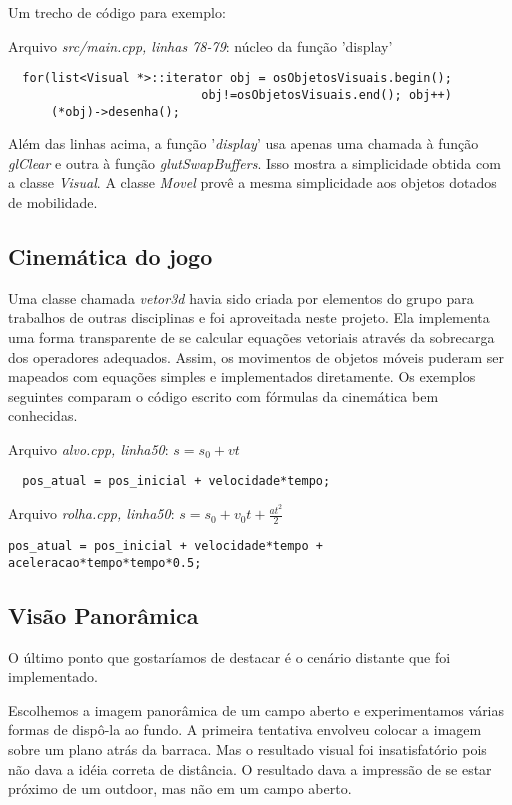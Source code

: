 \documentclass[a4paper,10pt]{article}
\begin{document}
Um trecho de código para exemplo:

Arquivo \emph{src/main.cpp, linhas 78-79}: núcleo da função 'display'
\begin{verbatim}
  for(list<Visual *>::iterator obj = osObjetosVisuais.begin();
                           obj!=osObjetosVisuais.end(); obj++)
      (*obj)->desenha();
\end{verbatim}

Além das linhas acima, a função '\emph{display}' usa apenas uma chamada à função \emph{glClear} e outra à função \emph{glutSwapBuffers}. Isso mostra a simplicidade obtida com a classe \emph{Visual}. A classe \emph{Movel} provê a mesma simplicidade aos objetos dotados de mobilidade.


\subsection{Cinemática do jogo}
Uma classe chamada \emph{vetor3d} havia sido criada por elementos do grupo para trabalhos de outras disciplinas e foi aproveitada neste projeto. Ela implementa uma forma transparente de se calcular equações vetoriais através da sobrecarga dos operadores adequados. Assim, os movimentos de objetos móveis puderam ser mapeados com equações simples e implementados diretamente. Os exemplos seguintes comparam o código escrito com fórmulas da cinemática bem conhecidas.

Arquivo \emph{alvo.cpp, linha50}: $s = s_0 + vt$
\begin{verbatim}
  pos_atual = pos_inicial + velocidade*tempo;
\end{verbatim}

Arquivo \emph{rolha.cpp, linha50}: $s = s_0 + v_0t + \frac{at^2}{2}$
{\small \begin{verbatim}
pos_atual = pos_inicial + velocidade*tempo + aceleracao*tempo*tempo*0.5;
\end{verbatim}}


\subsection{Visão Panorâmica}
O último ponto que gostaríamos de destacar é o cenário distante que foi implementado.

Escolhemos a imagem panorâmica de um campo aberto e experimentamos várias formas de dispô-la ao fundo. A primeira tentativa envolveu colocar a imagem sobre um plano atrás da barraca. Mas o resultado visual foi insatisfatório pois não dava a idéia correta de distância. O resultado dava a impressão de se estar próximo de um outdoor, mas não em um campo aberto.
\end{document}
